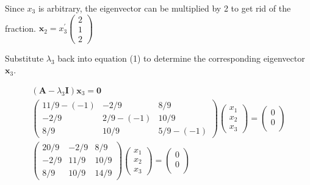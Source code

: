 \documentclass[12pt]{article}
\begin{document}
Since \(x_{3}\) is arbitrary, the eigenvector can be multiplied by 2 to get rid of
the fraction. 
\(\mathbf{x}_{2}=x_{3}^{\prime}\left(\begin{array}{l}2 \\ 1 \\ 2\end{array}\right)\)

Substitute \(\lambda_{3}\) back into equation (1) to determine the corresponding
eigenvector \(\mathbf{x}_{3}\).

\begin{equation*}
	\begin{array}{c}
		\left(\mathbf{A}-\lambda_{3} \mathbf{I}\right) \mathbf{x}_{3}=\mathbf{0}                                            \\
		\left(\begin{array}{ccc}
				11 / 9-(-1) & -2 / 9     & 8 / 9      \\
				-2 / 9      & 2 / 9-(-1) & 10 / 9     \\
				8 / 9       & 10 / 9     & 5 / 9-(-1)
			\end{array}\right)\left(\begin{array}{l}
				x_{1} \\
				x_{2} \\
				x_{3}
			\end{array}\right)=\left(\begin{array}{l}
				0 \\
				0 \\

			\end{array}\right) \\
		\left(\begin{array}{ccc}
				20 / 9 & -2 / 9 & 8 / 9  \\
				-2 / 9 & 11 / 9 & 10 / 9 \\
				8 / 9  & 10 / 9 & 14 / 9
			\end{array}\right)\left(\begin{array}{l}
				x_{1} \\
				x_{2} \\
				x_{3}
			\end{array}\right)=\left(\begin{array}{c}
				0 \\
				0 \\

			\end{array}\right)
	\end{array}
\end{equation*}
\end{document}
